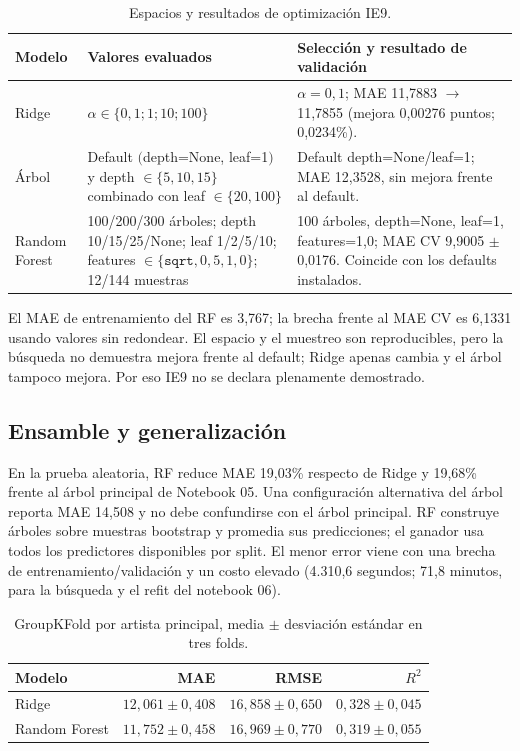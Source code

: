 \begin{table}[H]
\centering
\caption{Espacios y resultados de optimización IE9.}
\label{tab:optimizacion-ie9}
\small
\begin{tabularx}{\textwidth}{p{2.0cm}X p{3.6cm}}
\toprule
Modelo & Valores evaluados & Selección y resultado de validación \\
\midrule
Ridge & $\alpha\in\{0,1;1;10;100\}$ & $\alpha=0,1$; MAE 11,7883 $\to$ 11,7855 (mejora 0,00276 puntos; 0,0234\%). \\
Árbol & Default $($depth=None, leaf=1$)$ y depth $\in\{5,10,15\}$ combinado con leaf $\in\{20,100\}$ & Default depth=None/leaf=1; MAE 12,3528, sin mejora frente al default. \\
Random Forest & 100/200/300 árboles; depth 10/15/25/None; leaf 1/2/5/10; features $\in\{\texttt{sqrt},0,5,1,0\}$; 12/144 muestras & 100 árboles, depth=None, leaf=1, features=1,0; MAE CV 9,9005 $\pm$ 0,0176. Coincide con los defaults instalados. \\
\bottomrule
\end{tabularx}
\end{table}

El MAE de entrenamiento del RF es 3,767; la brecha frente al MAE CV es 6,1331 usando valores sin
redondear. El espacio y el muestreo son reproducibles, pero la búsqueda no demuestra mejora frente
al default; Ridge apenas cambia y el árbol tampoco mejora. Por eso IE9 no se declara plenamente
demostrado.

\subsection{Ensamble y generalización}

En la prueba aleatoria, RF reduce MAE 19,03\% respecto de Ridge y 19,68\% frente al árbol
principal de Notebook 05. Una configuración alternativa del árbol reporta MAE 14,508 y no debe
confundirse con el árbol principal. RF construye árboles sobre muestras bootstrap y promedia sus
predicciones; el ganador usa todos los predictores disponibles por split. El menor error viene
con una brecha de entrenamiento/validación y un costo elevado (4.310,6 segundos; 71,8 minutos, para la búsqueda y el refit del notebook 06).

\begin{table}[H]
\centering
\caption{GroupKFold por artista principal, media $\pm$ desviación estándar en tres folds.}
\begin{tabular}{lrrr}
\toprule
Modelo & MAE & RMSE & $R^2$ \\
\midrule
Ridge & $12,061\pm0,408$ & $16,858\pm0,650$ & $0,328\pm0,045$ \\
Random Forest & $11,752\pm0,458$ & $16,969\pm0,770$ & $0,319\pm0,055$ \\
\bottomrule
\end{tabular}
\end{table}


